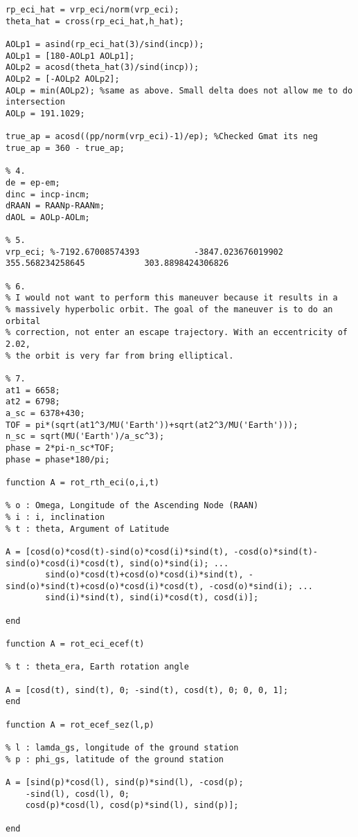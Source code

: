 \begin{lstlisting}[frame=lines,style=Matlab-editor,basicstyle = \mlttfamily]
rp_eci_hat = vrp_eci/norm(vrp_eci);
theta_hat = cross(rp_eci_hat,h_hat);

AOLp1 = asind(rp_eci_hat(3)/sind(incp));
AOLp1 = [180-AOLp1 AOLp1];
AOLp2 = acosd(theta_hat(3)/sind(incp));
AOLp2 = [-AOLp2 AOLp2];
AOLp = min(AOLp2); %same as above. Small delta does not allow me to do intersection
AOLp = 191.1029;

true_ap = acosd((pp/norm(vrp_eci)-1)/ep); %Checked Gmat its neg
true_ap = 360 - true_ap;

% 4.
de = ep-em;
dinc = incp-incm;
dRAAN = RAANp-RAANm;
dAOL = AOLp-AOLm;

% 5.
vrp_eci; %-7192.67008574393           -3847.023676019902          355.568234258645            303.8898424306826

% 6.
% I would not want to perform this maneuver because it results in a
% massively hyperbolic orbit. The goal of the maneuver is to do an orbital
% correction, not enter an escape trajectory. With an eccentricity of 2.02,
% the orbit is very far from bring elliptical.

% 7.
at1 = 6658;
at2 = 6798;
a_sc = 6378+430;
TOF = pi*(sqrt(at1^3/MU('Earth'))+sqrt(at2^3/MU('Earth')));
n_sc = sqrt(MU('Earth')/a_sc^3);
phase = 2*pi-n_sc*TOF;
phase = phase*180/pi;

function A = rot_rth_eci(o,i,t)

% o : Omega, Longitude of the Ascending Node (RAAN)
% i : i, inclination
% t : theta, Argument of Latitude

A = [cosd(o)*cosd(t)-sind(o)*cosd(i)*sind(t), -cosd(o)*sind(t)-sind(o)*cosd(i)*cosd(t), sind(o)*sind(i); ...
        sind(o)*cosd(t)+cosd(o)*cosd(i)*sind(t), -sind(o)*sind(t)+cosd(o)*cosd(i)*cosd(t), -cosd(o)*sind(i); ...
        sind(i)*sind(t), sind(i)*cosd(t), cosd(i)];

end

function A = rot_eci_ecef(t)

% t : theta_era, Earth rotation angle

A = [cosd(t), sind(t), 0; -sind(t), cosd(t), 0; 0, 0, 1];
end

function A = rot_ecef_sez(l,p)

% l : lamda_gs, longitude of the ground station
% p : phi_gs, latitude of the ground station

A = [sind(p)*cosd(l), sind(p)*sind(l), -cosd(p);
    -sind(l), cosd(l), 0;
    cosd(p)*cosd(l), cosd(p)*sind(l), sind(p)];

end
\end{lstlisting}
